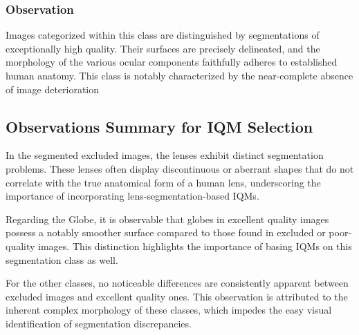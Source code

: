 \subsubsection{Observation}
Images categorized within this class are distinguished by segmentations of exceptionally high quality. Their surfaces are precisely delineated, and the morphology of the various ocular components faithfully adheres to established human anatomy. This class is notably characterized by the near-complete absence of image deterioration
\newpage
\subsection{Observations Summary for IQM Selection}
\label{sec:iqm_selection_summary}
In the segmented excluded images, the lenses exhibit distinct segmentation problems. These lenses often display discontinuous or aberrant shapes that do not correlate with the true anatomical form of a human lens, underscoring the importance of incorporating lens-segmentation-based IQMs.

Regarding the Globe, it is observable that globes in excellent quality images possess a notably smoother surface compared to those found in excluded or poor-quality images. This distinction highlights the importance of basing IQMs on this segmentation class as well.

For the other classes, no noticeable differences are consistently apparent between excluded images and excellent quality ones. This observation is attributed to the inherent complex morphology of these classes, which impedes the easy visual identification of segmentation discrepancies.